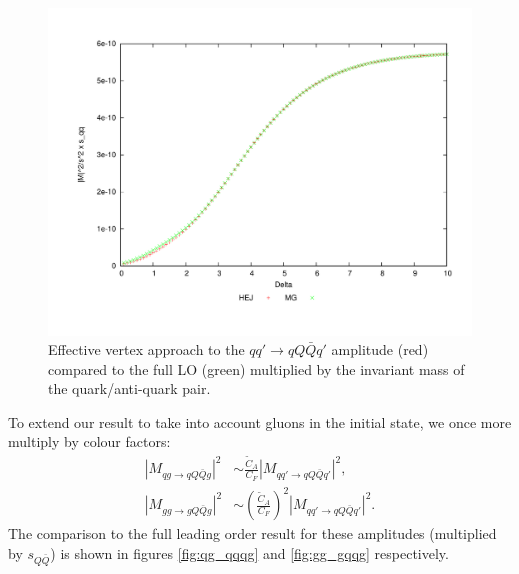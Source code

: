\begin{figure}[H]
\centering
\includegraphics[scale=0.45]{Images/qQ_qqqxQ_sqqx.pdf}
\caption{Effective vertex approach to the $qq' \to qQ\bar{Q}q'$ amplitude (red) compared to the full LO (green) multiplied by the invariant mass of the quark/anti-quark pair.}
\label{fig:qq_qqqq_sqq}
\end{figure}

To extend our result to take into account gluons in the initial state, we once more multiply by colour factors:
\begin{equation}
\begin{split}
|M_{qg \to qQ\bar{Q}g}|^2 &\sim \frac{\tilde{C}_A}{C_F} |M_{qq' \to qQ\bar{Q}q'}|^2, \\
|M_{gg \to gQ\bar{Q}g}|^2 &\sim \left(\frac{\tilde{C}_A}{C_F}\right)^2 |M_{qq' \to qQ\bar{Q}q'}|^2.
\end{split}
\end{equation}
The comparison to the full leading order result for these amplitudes (multiplied by $s_{Q\bar{Q}}$) is shown in figures \ref{fig:qg_qqqg} and \ref{fig:gg_gqqg} respectively. 

